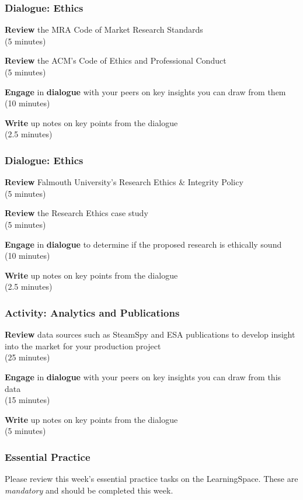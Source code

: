 \begin{frame}
	\frametitle{Dialogue: Ethics}
	
	\textbf{Review} the MRA Code of Market Research Standards \\
	(5 minutes)
	
	\vspace{2em}
	
	\textbf{Review} the ACM's Code of Ethics and Professional Conduct \\
	(5 minutes)
	
	\vspace{2em}
	
	\textbf{Engage} in \textbf{dialogue} with your peers on key insights you can draw from them \\
	(10 minutes)
	
	\vspace{2em}
	
	\textbf{Write} up notes on key points from the dialogue \\
	(2.5 minutes)
\end{frame}

\begin{frame}
	\frametitle{Dialogue: Ethics}
	
	\textbf{Review} Falmouth University's Research Ethics \& Integrity Policy \\
	(5 minutes)
	
	\vspace{2em}
	
	\textbf{Review} the Research Ethics case study \\
	(5 minutes)
	
	\vspace{2em}
	
	\textbf{Engage} in \textbf{dialogue} to determine if the proposed research is ethically sound \\
	(10 minutes)
	
	\vspace{2em}
	
	\textbf{Write} up notes on key points from the dialogue \\
	(2.5 minutes)
\end{frame}

\begin{frame}
	\frametitle{Activity: Analytics and Publications}
	
	\textbf{Review} data sources such as SteamSpy and ESA publications to develop insight into the market for your production project \\
	(25 minutes)
	
	\vspace{2em}
	
	\textbf{Engage} in \textbf{dialogue} with your peers on key insights you can draw from this data \\
	(15 minutes)
	
	\vspace{2em}
	
	\textbf{Write} up notes on key points from the dialogue \\
	(5 minutes)
\end{frame}

\begin{frame}
	\frametitle{Essential Practice}
	
	Please review this week's essential practice tasks on the LearningSpace. These are \textit{mandatory} and should be completed this week.
	
\end{frame}


